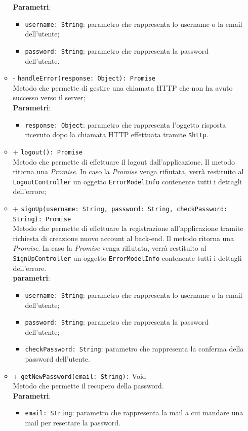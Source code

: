 \begin{itemize}
\begin{itemize}
			\textbf{Parametri}: 
			\begin{itemize}
				\item \texttt{username: String}: parametro che rappresenta lo username o la email dell'utente;
				\item \texttt{password: String}: parametro che rappresenta la password dell'utente.
			\end{itemize}
		\item - \texttt{handleError(response: Object): Promise} \\ Metodo che permette di gestire una chiamata HTTP che non ha avuto successo verso il server; \\
			\textbf{Parametri}:
			\begin{itemize}
				\item \texttt{response: Object}: parametro che rappresenta l'oggetto risposta ricevuto dopo la chiamata HTTP effettuata tramite \texttt{\$http}.
			\end{itemize}
		\item + \texttt{logout(): Promise} \\ Metodo che permette di effettuare il logout dall'applicazione. Il metodo ritorna una \textit{Promise}. In caso la \textit{Promise} venga rifiutata, verrà restituito al \texttt{LogoutController} un oggetto \texttt{ErrorModelInfo} contenente tutti i dettagli dell'errore; \\
		\item + \texttt{signUp(username: String, password: String, checkPassword: String): Promise} \\Metodo che permette di effettuare la registrazione all'applicazione tramite richiesta di creazione nuovo account al back-end. Il metodo ritorna una \textit{Promise}. In caso la \textit{Promise} venga rifiutata, verrà restituito al \texttt{SignUpController} un oggetto \texttt{ErrorModelInfo} contenente tutti i dettagli dell'errore. \\
			\textbf{parametri}:
			\begin{itemize}
				\item \texttt{username: String}: parametro che rappresenta lo username o la email dell'utente;
				\item \texttt{password: String}: parametro che rappresenta la password dell'utente;
				\item \texttt{checkPassword: String}: parametro che rappresenta la conferma della password dell'utente.
			\end{itemize}
		\item + \texttt{getNewPassword(email: String):} Void \\Metodo che permette il recupero della password. \\
			\textbf{Parametri}:
			\begin{itemize}
				\item \texttt{email: String}: parametro che rappresenta la mail a cui mandare una mail per resettare la password.
			\end{itemize}
	\end{itemize}
\end{itemize}

